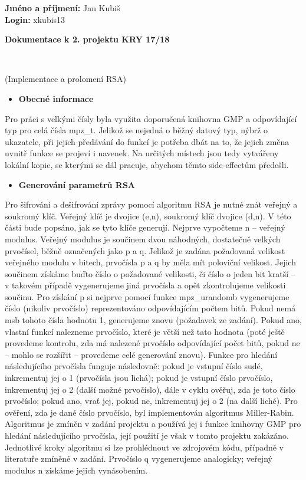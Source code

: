 \documentclass[11pt,a4paper]{article}
\begin{document}
\noindent \textbf{Jméno a příjmení:} Jan Kubiš\\
\textbf{Login:} xkubis13\\
\smallskip
\begin{center}
	\begin{LARGE}\textbf{Dokumentace k 2. projektu KRY 17/18}\end{LARGE}\\
	\begin{large}(Implementace a prolomení RSA)\end{large}
\end{center}
\bigskip

\begin{itemize}[leftmargin=0cm]
\item{\textbf{Obecné informace}}
\end{itemize}
Pro práci s velkými čísly byla využita doporučená knihovna GMP a odpovídající typ pro celá čísla mpz\_t. Jelikož se nejedná o běžný datový typ, nýbrž o ukazatele, při jejich předávání do funkcí je potřeba dbát na to, že jejich změna uvnitř funkce se projeví i navenek. Na určitých místech jsou tedy vytvářeny lokální kopie, se kterými se dál pracuje, abychom těmto side-effectům předešli.


\begin{itemize}[leftmargin=0cm]
\item{\textbf{Generování parametrů RSA}}
\end{itemize}
Pro šifrování a dešifrování zprávy pomocí algoritmu RSA je nutné znát veřejný a soukromý klíč. Veřejný klíč je dvojice (e,n), soukromý klíč dvojice (d,n). V této části bude popsáno, jak se tyto klíče generují. Nejprve vypočteme n -- veřejný modulus. Veřejný modulus je součinem dvou náhodných, dostatečně velkých prvočísel, běžně označených jako p a q. Jelikož je zadána požadovaná velikost veřejného modulu v bitech, prvočísla p a q by měla mít poloviční velikost. Jejich součinem získáme buďto číslo o požadované velikosti, či číslo o jeden bit kratší -- v takovém případě vygenerujeme jiná prvočísla a opět zkontrolujeme velikosti součinu. Pro získání p si nejprve pomocí funkce mpz\_urandomb vygenerujeme číslo (nikoliv prvočíslo) reprezentováno odpovídajícím počtem bitů. Pokud nemá msb tohoto čísla hodnotu 1, generujeme znovu (požadavek ze zadání). Pokud ano, vlastní funkcí nalezneme prvočíslo, které je větší než tato hodnota (poté ještě provedeme kontrolu, zda má nalezené prvočíslo odpovídající počet bitů, pokud ne -- mohlo se rozšířit -- provedeme celé generování znovu). Funkce pro hledání následujícího prvočísla funguje následovně: pokud je vstupní číslo sudé, inkrementuj jej o 1 (prvočísla jsou lichá); pokud je vstupní číslo prvočíslo, inkrementuj jej o 2 (další možné prvočíslo), dále v cyklu ověřuj, zda je toto číslo prvočíslo; pokud ano, vrať jej, pokud ne, inkrementuj jej o 2 (na další liché). Pro ověření, zda je dané číslo prvočíslo, byl implementován algoritmus Miller-Rabin. Algoritmus je zmíněn v zadání projektu a používá jej i funkce knihovny GMP pro hledání následujícího prvočísla, její použití je však v tomto projektu zakázáno. Jednotlivé kroky algoritmu si lze prohlédnout ve zdrojovém kódu, případně v literatuře zmíněné v zadání. Prvočíslo q vygenerujeme analogicky; veřejný modulus n získáme jejich vynásobením.
\end{document}

